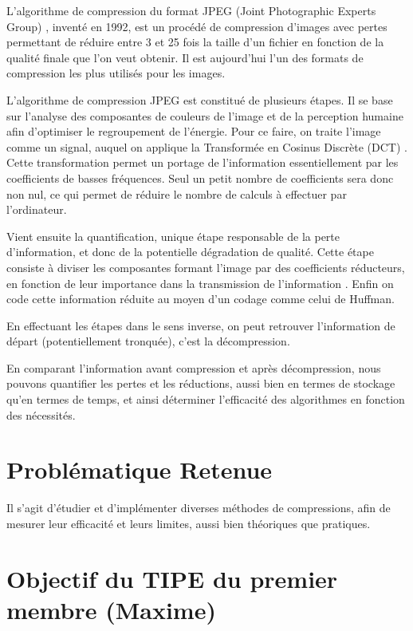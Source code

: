 \documentclass[a4paper, 11pt]{article}
\let\cite=\supercite
\begin{document}
L'algorithme de compression du format JPEG (Joint Photographic Experts Group) \cite{jpeg}, inventé en 1992, est un procédé de compression d'images avec pertes permettant de réduire entre 3 et 25 fois la taille d'un fichier en fonction de la qualité finale que l'on veut obtenir. Il est aujourd'hui l'un des formats de compression les plus utilisés pour les images.

L'algorithme de compression JPEG est constitué de plusieurs étapes. Il se base sur l'analyse des composantes de couleurs de l'image et de la perception humaine afin d'optimiser le regroupement de l'énergie. Pour ce faire, on traite l'image comme un signal, auquel on applique la Transformée en Cosinus Discrète (DCT) \cite{jpeg}. Cette transformation permet un portage de l'information essentiellement par les coefficients de basses fréquences. Seul un petit nombre de coefficients sera donc non nul, ce qui permet de réduire le nombre de calculs à effectuer par l'ordinateur.

Vient ensuite la quantification, unique étape responsable de la perte d'information, et donc de la potentielle dégradation de qualité. Cette étape consiste à diviser les composantes formant l'image par des coefficients réducteurs, en fonction de leur importance dans la transmission de l'information \cite{code-theory} \cite{jpeg}. Enfin on code cette information \og réduite \fg au moyen d'un codage comme celui de Huffman.

En effectuant les étapes dans le sens inverse, on peut retrouver l'information de départ (potentiellement tronquée), c'est la décompression.

En comparant l'information avant compression et après décompression, nous pouvons quantifier les pertes et les réductions, aussi bien en termes de stockage qu'en termes de temps, et ainsi déterminer l'efficacité des algorithmes en fonction des nécessités.

\section*{Probl\'ematique Retenue}
Il s'agit d'étudier et d'implémenter diverses méthodes de compressions, afin de mesurer leur efficacité et leurs limites, aussi bien théoriques que pratiques.

\section*{Objectif du TIPE du premier membre (Maxime)}
\end{document}
